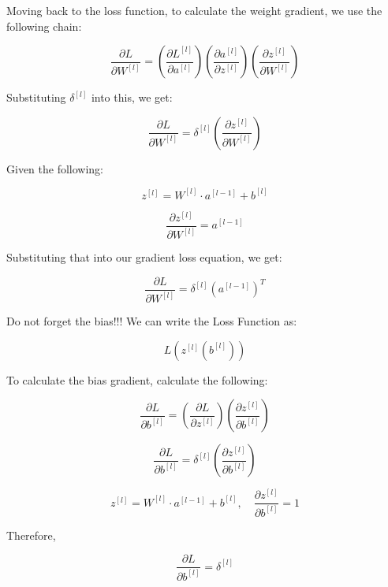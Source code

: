 \documentclass[11pt,a4paper]{article}
\begin{document}
Moving back to the loss function, to calculate the weight gradient, we use the following chain:

\begin{equation}
\frac{\partial{L}}{\partial{W^{[l]}}} = \left(\frac{\partial{L^{[l]}}}{\partial{a^{[l]}}}\right) \left(\frac{\partial{a^{[l]}}}{\partial{z^{[l]}}}\right) \left(\frac{\partial{z^{[l]}}}{\partial{W^{[l]}}}\right)
\end{equation}

Substituting $\delta^{[l]}$ into this, we get:

\begin{equation}
\frac{\partial{L}}{\partial{W^{[l]}}} = \delta^{[l]} \left(\frac{\partial{z^{[l]}}}{\partial{W^{[l]}}}\right)
\end{equation}

Given the following:

\begin{equation}
z^{[l]} = W^{[l]} \cdot a^{[l-1]} + b^{[l]}
\end{equation}

\begin{equation}
\frac{\partial{z^{[l]}}}{\partial{W^{[l]}}} = a^{[l-1]}
\end{equation}

Substituting that into our gradient loss equation, we get:

\begin{mdframed}[style=eqbox]
\begin{equation}
\frac{\partial{L}}{\partial{W^{[l]}}} = \delta^{[l]} (a^{[l-1]})^T
\end{equation}
\end{mdframed}

Do not forget the bias!!! We can write the Loss Function as:

\begin{equation}
L(z^{[l]}(b^{[l]}))
\end{equation}

To calculate the bias gradient, calculate the following:

\begin{equation}
\frac{\partial L}{\partial b^{[l]}} = \left(\frac{\partial L}{\partial z^{[l]}}\right) \left(\frac{\partial z^{[l]}}{\partial b^{[l]}}\right)
\end{equation}

\begin{equation}
\frac{\partial L}{\partial b^{[l]}} = \delta^{[l]} \left(\frac{\partial z^{[l]}}{\partial b^{[l]}}\right)
\end{equation}

\begin{equation}
z^{[l]} = W^{[l]} \cdot a^{[l-1]} + b^{[l]}, \quad \frac{\partial z^{[l]}}{\partial b^{[l]}} = 1
\end{equation}

Therefore,

\begin{mdframed}[style=eqbox]
\begin{equation}
\frac{\partial L}{\partial b^{[l]}} = \delta^{[l]}
\end{equation}
\end{mdframed}
\end{document}
